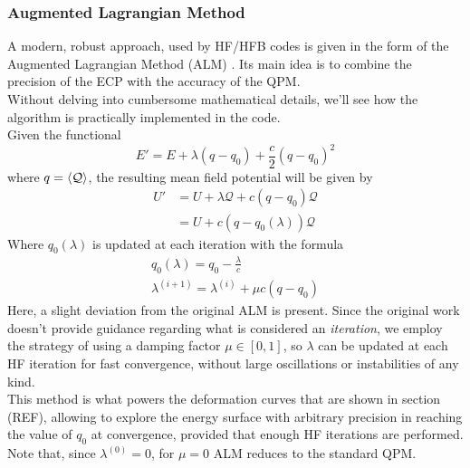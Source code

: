 \subsubsection{Augmented Lagrangian Method}
A modern, robust approach, used by HF/HFB codes \cite{RYSSENS2015175,CHEN2022108344} is given in the form of the Augmented Lagrangian Method (ALM) \cite{Staszczak2010}.
Its main idea is to combine the precision of the ECP with the accuracy of the QPM.
\\Without delving into cumbersome mathematical details, we'll see how the algorithm is practically implemented in the code.
\\Given the functional
\begin{equation}
    \label{eq:alm_lagrangian}
    E' = E + \lambda (q-q_0) + \frac c 2 (q-q_0)^2
\end{equation}
where $q = \expval{{\mathcal Q}}$, the resulting mean field potential will be given by
\begin{align}
    U' &= U + \lambda  {\mathcal Q} + c(q-q_0) {\mathcal Q} 
    \\ &= U + c(q-q_0(\lambda)) {\mathcal Q}
\end{align}
Where $q_0(\lambda)$ is updated at each iteration with the formula
\begin{align}
    \label{eq:alm_q0}
    q_0(\lambda) = q_0 - \frac{\lambda}{c}
    \\\lambda ^{(i+1)} = \lambda^{(i)}+\mu c(q-q_0)
\end{align}
Here, a slight deviation from the original ALM is present. Since the original work \cite{Staszczak2010} doesn't provide guidance regarding what is considered an \textit{iteration}, we employ the strategy \cite{CHEN2022108344} of using a damping factor $\mu\in [0, 1]$, so $\lambda$ can be updated at each HF iteration for fast convergence, without large oscillations or instabilities of any kind.
\\This method is what powers the deformation curves that are shown in section (REF), allowing to explore the energy surface with arbitrary precision in reaching the value of $q_0$ at convergence, provided that enough HF iterations are performed.
\\Note that, since $\lambda^{(0)}=0$, for $\mu=0$ ALM reduces to the standard QPM.

